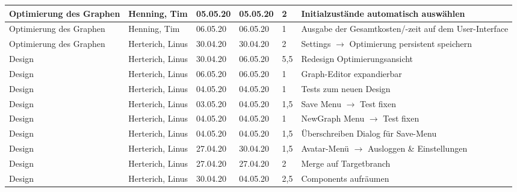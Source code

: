 \begin{longtable}{|p{4cm}|p{2cm}|p{1.2cm}|p{1.2cm}|p{0.7cm}|p{3.8cm}|}
  \hline
  Optimierung des Graphen                                               & Henning, Tim          & 05.05.20 & 05.05.20 & 2     & Initialzustände automatisch auswählen \\
  \hline
  Optimierung des Graphen                                               & Henning, Tim          & 06.05.20 & 06.05.20 & 1     & Ausgabe der Gesamtkosten/-zeit auf dem User-Interface \\
  \hline
  Optimierung des Graphen                                               & Herterich, Linus      & 30.04.20 & 30.04.20 & 2     & Settings $\rightarrow$ Optimierung persistent speichern \\
  \hline
  Design                                                                & Herterich, Linus      & 30.04.20 & 06.05.20 & 5,5   & Redesign Optimierungsansicht \\
  \hline
  Design                                                                & Herterich, Linus      & 06.05.20 & 06.05.20 & 1     & Graph-Editor expandierbar \\
  \hline
  Design                                                                & Herterich, Linus      & 04.05.20 & 04.05.20 & 1     & Tests zum neuen Design \\
  \hline
  Design                                                                & Herterich, Linus      & 03.05.20 & 04.05.20 & 1,5   & Save Menu $\rightarrow$ Test fixen \\
  \hline
  Design                                                                & Herterich, Linus      & 04.05.20 & 04.05.20 & 1     & NewGraph Menu $\rightarrow$ Test fixen \\
  \hline
  Design                                                                & Herterich, Linus      & 04.05.20 & 04.05.20 & 1,5   & Überschreiben Dialog für Save-Menu \\
  \hline
  Design                                                                & Herterich, Linus      & 27.04.20 & 30.04.20 & 1,5   & Avatar-Menü $\rightarrow$ Ausloggen \& Einstellungen \\
  \hline
  Design                                                                & Herterich, Linus      & 27.04.20 & 27.04.20 & 2     & Merge auf Targetbranch \\
  \hline
  Design                                                                & Herterich, Linus      & 30.04.20 & 04.05.20 & 2,5   & Components aufräumen \\
  \hline

\end{longtable}
